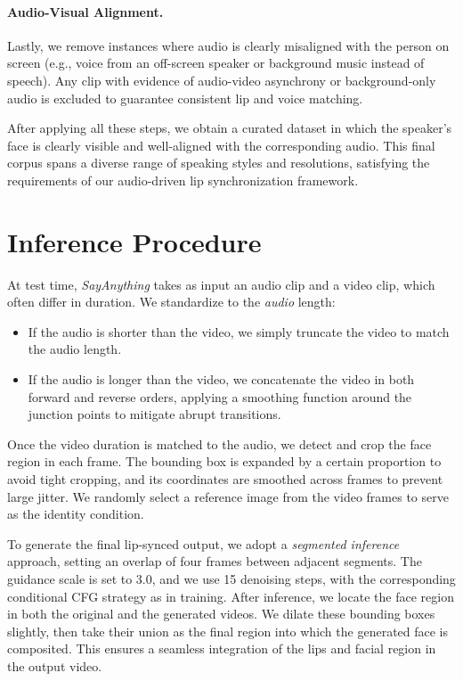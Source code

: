 \paragraph{Audio-Visual Alignment.}
Lastly, we remove instances where audio is clearly misaligned with the person on screen (e.g., voice from an off-screen speaker or background music instead of speech). 
Any clip with evidence of audio-video asynchrony or background-only audio is excluded to guarantee consistent lip and voice matching.

After applying all these steps, we obtain a curated dataset in which the speaker’s face is clearly visible and well-aligned with the corresponding audio. This final corpus spans a diverse range of speaking styles and resolutions, satisfying the requirements of our audio-driven lip synchronization framework.

\vspace{-0.3cm}
\section{Inference Procedure}
At test time, \emph{SayAnything} takes as input an audio clip and a video clip, which often differ in duration. We standardize to the \emph{audio} length: 
\begin{itemize}
    \item If the audio is shorter than the video, we simply truncate the video to match the audio length.
    \vspace{-0.3cm}
    \item If the audio is longer than the video, we concatenate the video in both forward and reverse orders, applying a smoothing function around the junction points to mitigate abrupt transitions.
\end{itemize}
\vspace{-0.3cm}
Once the video duration is matched to the audio, we detect and crop the face region in each frame. The bounding box is expanded by a certain proportion to avoid tight cropping, and its coordinates are smoothed across frames to prevent large jitter. We randomly select a reference image from the video frames to serve as the identity condition.

To generate the final lip-synced output, we adopt a \emph{segmented inference} approach, setting an overlap of four frames between adjacent segments. The guidance scale is set to 3.0, and we use 15 denoising steps, with the corresponding conditional CFG strategy as in training. After inference, we locate the face region in both the original and the generated videos. We dilate these bounding boxes slightly, then take their union as the final region into which the generated face is composited. This ensures a seamless integration of the lips and facial region in the output video.


